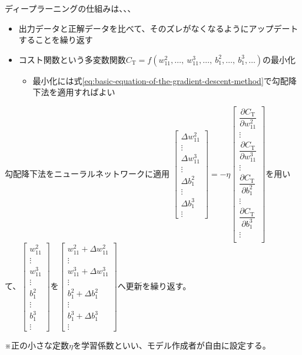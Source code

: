 \documentclass[dvipdfmx,aspectratio=169]{beamer}
\begin{document}
	\begin{frame}{ディープラーニングの仕組みは、、、}
		\begin{itemize}
			\item 出力データと正解データを比べて、そのズレがなくなるようにアップデートすることを繰り返す
			\item コスト関数という多変数関数$ C_\mathrm{T} = f(w^2_{11}, \dots,\ w^3_{11},\dots,\ b^2_1,\dots,\ b^3_1,\dots) $の最小化
			\begin{itemize}
				\item 最小化には式\eqref{eq:basic-equation-of-the-gradient-descent-method}で勾配降下法を適用すればよい
			\end{itemize}
		\end{itemize}
	\end{frame}
	\begin{frame}{勾配降下法をニューラルネットワークに適用}
		$ \begin{bmatrix}
			\Delta w^2_{11}\\ \vdots\\
			\Delta w^3_{11}\\ \vdots\\
			\Delta b^2_1\\ \vdots\\
			\Delta b^3_1\\ \vdots
		\end{bmatrix} = -\eta \begin{bmatrix}
			\dfrac{\partial C_\mathrm{T}}{\partial w^2_{11}}\\ \vdots\\
			\dfrac{\partial C_\mathrm{T}}{\partial w^3_{11}}\\ \vdots\\
			\dfrac{\partial C_\mathrm{T}}{\partial b^2_1}\\ \vdots\\
			\dfrac{\partial C_\mathrm{T}}{\partial b^3_1}\\ \vdots\\
		\end{bmatrix} $を用いて、$ \begin{bmatrix}
			w^2_{11}\\ \vdots\\
			w^3_{11}\\ \vdots\\
			b^2_1\\ \vdots\\
			b^3_1\\ \vdots
		\end{bmatrix} $を$ \begin{bmatrix}
			w^2_{11} + \Delta w^2_{11}\\ \vdots\\
			w^3_{11} + \Delta w^3_{11}\\ \vdots\\
			b^2_1 + \Delta b^2_1\\ \vdots\\
			b^3_1 + \Delta b^3_1\\ \vdots
		\end{bmatrix} $へ更新を繰り返す。
	
		※正の小さな定数$ \eta $を\alert{学習係数}といい、モデル作成者が自由に設定する。
	\end{frame}
	
\end{document}
